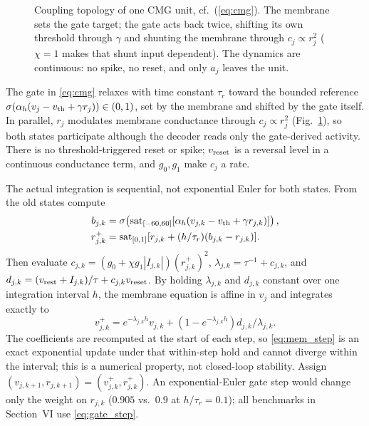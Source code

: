\documentclass[letterpaper, 10 pt, conference]{ieeeconf}
\newcommand{\sat}{\operatorname{sat}}
\begin{document}
\begin{figure}[t]
\centering
\resizebox{0.86\columnwidth}{!}{}
\caption{Coupling topology of one CMG unit, cf.~(\ref{eq:cmg}). The membrane sets
 the gate target; the gate acts back twice, shifting its own threshold through
 $\gamma$ and shunting the membrane through $c_j\propto r_j^2$ ($\chi=1$ makes
 that shunt input dependent). The dynamics are continuous: no spike, no reset,
 and only $a_j$ leaves the unit.}
\label{fig:cmgunit}
\end{figure}


%
The gate in \eqref{eq:cmg} relaxes with time constant $\tau_r$ toward the bounded reference $\sigma(\alpha_h(v_j-v_{\rm th}+\gamma r_j))\in(0,1)$, set by the membrane and shifted by the gate itself. In parallel, $r_j$ modulates membrane conductance through $c_j\propto r_j^2$ (Fig.~\ref{fig:cmgunit}), so both states participate although the decoder reads only the gate-derived activity. There is no threshold-triggered reset or spike; $v_{\rm reset}$ is a reversal level in a continuous conductance term, and $g_0,g_1$ make $c_j$ a rate.

The actual integration is sequential, not exponential Euler for both
states. From the old states compute
\begin{align}
 b_{j,k}&=\sigma\!\left(\sat_{[-60,60]}
       [\alpha_h(v_{j,k}-v_{\rm th}+\gamma r_{j,k})]\right),\\
 r_{j,k}^{+}&=\sat_{[0,1]}
       [r_{j,k}+(h/\tau_r)(b_{j,k}-r_{j,k})].
 \label{eq:gate_step}
\end{align}
Then evaluate $c_{j,k}=(g_0+\chi g_1|I_{j,k}|)(r_{j,k}^{+})^2$,
$\lambda_{j,k}=\tau^{-1}+c_{j,k}$, and
$d_{j,k}=(v_{\rm rest}+I_{j,k})/\tau+c_{j,k}v_{\rm reset}$. By holding $\lambda_{j,k}$ and $d_{j,k}$ constant over one integration interval $h$, the membrane equation is affine in $v_j$ and integrates exactly to
\begin{equation}
 v_{j,k}^{+}=e^{-\lambda_{j,k}h}v_{j,k}
       +(1-e^{-\lambda_{j,k}h})d_{j,k}/\lambda_{j,k}.
 \label{eq:mem_step}
\end{equation}
The coefficients are recomputed at the start of each step, so \eqref{eq:mem_step} is an exact exponential update under that within-step hold and cannot diverge within the interval; this is a numerical property, not closed-loop stability. Assign $(v_{j,k+1},r_{j,k+1})=(v_{j,k}^{+},r_{j,k}^{+})$.
An exponential-Euler gate step would change only the weight on $r_{j,k}$ ($0.905$ vs.\ $0.9$ at $h/\tau_r=0.1$); all benchmarks in Section~VI use \eqref{eq:gate_step}.
\end{document}
